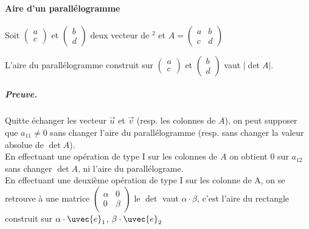\paragraph{Aire d'un parallélogramme}
Soit $\begin{pmatrix} a \\ c \end{pmatrix}$ et $\begin{pmatrix} b \\ d \end{pmatrix}$ deux vecteur de \R$^2$ et $A = \begin{pmatrix}
    a & b \\
    c & d
\end{pmatrix}$
\begin{theorem}
    L'aire du parallélogramme construit sur $\begin{pmatrix} a \\ c \end{pmatrix}$ et $\begin{pmatrix} b \\ d \end{pmatrix}$ vaut $|\det A|$.
\end{theorem}

\subparagraph{Preuve.}
Quitte  échanger les vecteur $\vec{u}$ et $\vec{v}$ (resp. les colonnes de $A$), on peut supposer que $a_{11} \neq 0$ sans changer l'aire du parallélogramme (resp. sans changer la valeur absolue de $\det A$).
\\
En effectuant une opération de type I sur les colonnes de $A$ on obtient $0$ sur $a_{12}$ sans changer $\det A$, ni l'aire du parallélograme.
\\
En effectuant une deuxième opération de type I sur les colonne de A, on se retrouve à une matrice $\begin{pmatrix}
    \alpha & 0\\
    0 & \beta
\end{pmatrix}$ le $\det$ vaut $\alpha \cdot \beta$, c'est l'aire du rectangle construit sur $\alpha \cdot \uvec{e}_1$, $\beta\cdot\uvec{e}_2$

